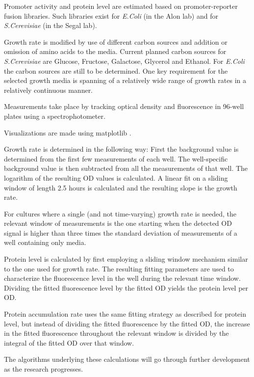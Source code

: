 \documentclass[a4page,notitlepage]{article}
\begin{document}
Promoter activity and protein level are estimated based on promoter-reporter fusion libraries.
Such libraries exist for \emph{E.Coli} (in the Alon lab) and for \emph{S.Cerevisiae} (in the Segal lab).

Growth rate is modified by use of different carbon sources and addition or omission of amino acids to the media.
Current planned carbon sources for \emph{S.Cerevisiae} are Glucose, Fructose, Galactose, Glycerol and Ethanol.
For \emph{E.Coli} the carbon sources are still to be determined.
One key requirement for the selected growth media is spanning of a relatively wide range of growth rates in a relatively continuous manner.

Measurements take place by tracking optical density and fluorescence in 96-well plates using a spectrophotometer.

Visualizations are made using matplotlib \parencite{Hunter2007}.

Growth rate is determined in the following way:
First the background value is determined from the first few measurements of each well.
The well-specific background value is then subtracted from all the measurements of that well.
The logarithm of the resulting OD values is calculated.
A linear fit on a sliding window of length 2.5 hours is calculated and the resulting slope is the growth rate.

For cultures where a single (and not time-varying) growth rate is needed, the relevant window of measurements is the one starting when the detected OD signal is higher than three times the standard deviation of measurements of a well containing only media.

Protein level is calculated by first employing a sliding window mechanism similar to the one used for growth rate.
The resulting fitting parameters are used to characterize the fluorescence level in the well during the relevant time window.
Dividing the fitted fluorescence level by the fitted OD yields the protein level per OD.

Protein accumulation rate uses the same fitting strategy as described for protein level, but instead of dividing the fitted fluorescence by the fitted OD, the increase in the fitted fluorescence throughout the relevant window is divided by the integral of the fitted OD over that window.

The algorithms underlying these calculations will go through further development as the research progresses.
\printbibliography
\end{document}
